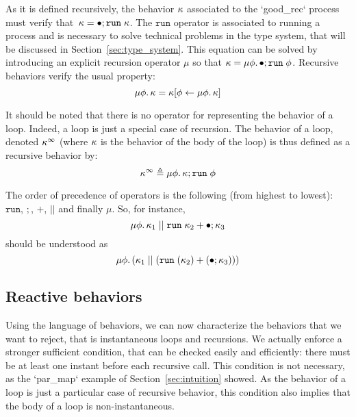 \documentclass[9pt,preprint]{sigplanconf}
\newcommand{\deq}{\triangleq}
\begin{document}
As it is defined recursively, the behavior  $\kappa$  associated to the `good_rec` process must verify that~\mbox{$ \kappa = \bullet ; \mathtt{run}\; \kappa$}. The $\mathtt{run}$ operator is associated to running a process and is necessary to solve technical problems in the type system, that will be discussed in Section~\ref{sec:type_system}. This equation can be solved by introducing an explicit recursion operator $\mu$ so that $\kappa = \mu \phi.\, \bullet ; \mathtt{run}\; \phi$. Recursive behaviors verify the usual property:
\[ \mu \phi.\, \kappa = \kappa[\phi \leftarrow \mu \phi.\, \kappa] \]

It should be noted that there is no operator for representing the behavior of a loop. Indeed, a loop is just a special case of recursion. The behavior of a loop, denoted $\kappa^\infty$ (where $\kappa$ is the behavior of the body of the loop) is thus defined as a recursive behavior by:
\[\effinf{\rk} \deq \effrec{\effvar}{\effcon{\rk}{\effrun{\effvar}}} \]

The order of precedence of operators is the following (from highest to lowest): $\mathtt{run}$, $;$, $+$, $||$ and finally $\mu$. So, for instance, 
\[ \mu \phi.\, \kappa_1 \mid\mid \mathtt{run}\; \kappa_2 + \bullet ; \kappa_3 \] 
should be understood as 
\[ \mu \phi.\, (\kappa_1 \mid\mid (\mathtt{run}\; (\kappa_2) + (\bullet ; \kappa_3))) \]


%
%
%
%
%


\subsection{Reactive behaviors}
\label{sec:reactive_behavior}

Using the language of behaviors, we can now characterize the behaviors that we want to reject, that is instantaneous loops and recursions. We actually enforce a stronger sufficient condition, that can be checked easily and efficiently: there must be at least one instant before each recursive call. This condition is not necessary, as the `par_map` example of Section~\ref{sec:intuition} showed. As the behavior of a loop is just a particular case of recursive behavior, this condition also implies that the body of a loop is non-instantaneous.
\end{document}
